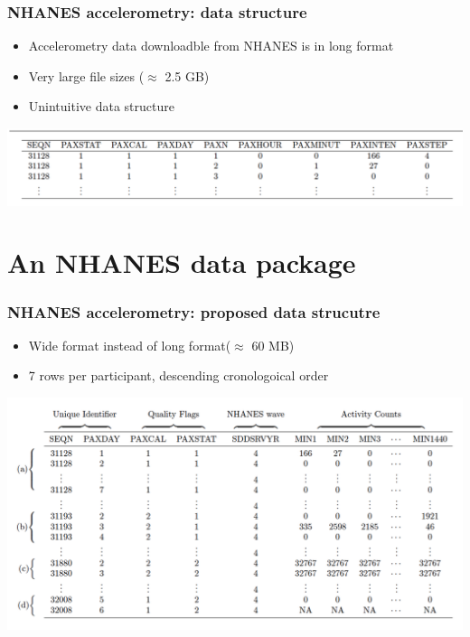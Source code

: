\documentclass[10pt]{beamer}\usepackage[]{graphicx}\usepackage[]{color}
\begin{document}
\begin{frame}
\frametitle{NHANES accelerometry: data structure}
\begin{itemize}
\item Accelerometry data downloadble from NHANES is in long format
\item Very large file sizes ($\approx$ 2.5 GB)
\item Unintuitive data structure
\end{itemize}
\includegraphics[width=\textwidth]{accel_data_long}
\end{frame}





\section{An NHANES data package}


\begin{frame}
\frametitle{NHANES accelerometry: proposed data strucutre}
\begin{itemize}
\item Wide format instead of long format\footnotemark ($\approx$ 60 MB)
\item 7 rows per participant, descending cronologoical order
\end{itemize}
\includegraphics[width=\textwidth]{accel_data_wide}
\end{frame}
\end{document}

